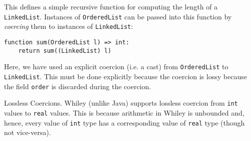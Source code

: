 This defines a simple recursive function for computing the length of a \lstinline{LinkedList}.  Instances of \lstinline{OrderedList} can be passed into this function by {\em coercing} them to instances of \lstinline{LinkedList}:

\begin{lstlisting}
function sum(OrderedList l) => int:
    return sum((LinkedList) l)
\end{lstlisting}

Here, we have used an explicit coercion (i.e. a cast) from \lstinline{OrderedList} to \lstinline{LinkedList}.  This must be done explicitly because the coercion is lossy because the field \lstinline{order} is discarded during the coercion.

\begin{insight}{Lossless Coercions.}
Whiley (unlike Java) supports lossless coercion from \lstinline{int} values to \lstinline{real} values.  This is because arithmetic in Whiley is unbounded and, hence, every value of \lstinline{int} type has a corresponding value of \lstinline{real} type (though not vice-versa).
\end{insight}


